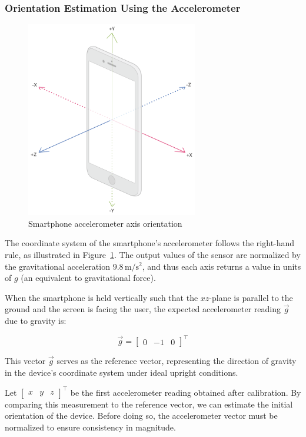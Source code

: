 \documentclass{article}
\begin{document}
    \FloatBarrier
    \subsubsection{Orientation Estimation Using the Accelerometer}

    \FloatBarrier
    \begin{figure}[ht]
        \centering
        \includegraphics[width=7.5cm]{Images/accelerometer.png}
        \caption{Smartphone accelerometer axis orientation}
        \label{fig:accelerometer}
    \end{figure}

    The coordinate system of the smartphone's accelerometer follows the right-hand
    rule, as illustrated in Figure~\ref{fig:accelerometer}. The output values of
    the sensor are normalized by the gravitational acceleration
    $9.8\,\mathrm{m/s^2}$, and thus each axis returns a value in units of $g$ (an
    equivalent to gravitational force).

    When the smartphone is held vertically such that the $xz$-plane is parallel to
    the ground and the screen is facing the user, the expected accelerometer
    reading $\vec{g}$ due to gravity is:

    \[
        \vec{g}=
        \begin{bmatrix}
            0 & -1 & 0
        \end{bmatrix}^{\top}
    \]

    This vector $\vec{g}$ serves as the reference vector, representing the
    direction of gravity in the device's coordinate system under ideal upright
    conditions.

    Let $\begin{bmatrix}
        x & y & z
    \end{bmatrix}^{\top}$ be the first accelerometer reading obtained after
    calibration. By comparing this measurement to the reference vector, we can
    estimate the initial orientation of the device. Before doing so, the
    accelerometer vector must be normalized to ensure consistency in magnitude.
\end{document}
